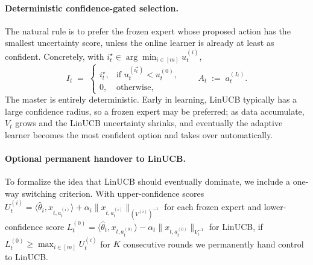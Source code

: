 \documentclass{article}
\theoremstyle{definition}
\theoremstyle{remark}
\theoremstyle{remark}
\begin{document}
\paragraph{Deterministic confidence-gated selection.}
The natural rule is to prefer the frozen expert whose proposed action
has the smallest uncertainty score, unless the online learner is
already at least as confident. Concretely, with
$i_t^\star\in\arg\min_{i\in[m]}u_t^{(i)}$,
\[
I_t \;=\;
\begin{cases}
i_t^\star, & \text{if }u_t^{(i_t^\star)}<u_t^{(0)},\\[2pt]
0, & \text{otherwise},
\end{cases}
\qquad A_t \;:=\; a_t^{(I_t)}.
\]
The master is entirely deterministic. Early in learning, LinUCB
typically has a large confidence radius, so a frozen expert may be
preferred; as data accumulate, $V_t$ grows and the LinUCB uncertainty
shrinks, and eventually the adaptive learner becomes the most confident
option and takes over automatically.

\paragraph{Optional permanent handover to LinUCB.}
To formalize the idea that LinUCB should eventually dominate, we include
a one-way switching criterion. With upper-confidence scores
$U_t^{(i)} = \langle\widehat\theta_i,x_{t,a_t^{(i)}}\rangle + \alpha_i\|x_{t,a_t^{(i)}}\|_{(V^{(i)})^{-1}}$
for each frozen expert and lower-confidence score
$L_t^{(0)} = \langle\widehat\theta_t,x_{t,a_t^{(0)}}\rangle - \alpha_t\|x_{t,a_t^{(0)}}\|_{V_t^{-1}}$
for LinUCB, if $L_t^{(0)} \ge \max_{i\in[m]} U_t^{(i)}$ for $K$
consecutive rounds we permanently hand control to LinUCB.
\end{document}
